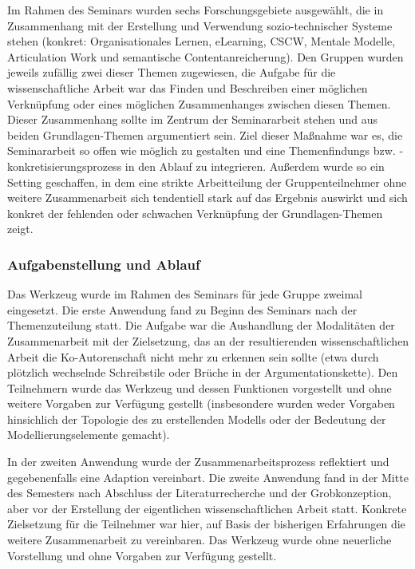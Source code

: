 Im Rahmen des Seminars wurden sechs Forschungsgebiete ausgewählt, die in Zusammenhang mit der Erstellung und Verwendung sozio-technischer Systeme stehen (konkret: Organisationales Lernen, eLearning, \gls{CSCW}, Mentale Modelle, Articulation Work und semantische Contentanreicherung). Den Gruppen wurden jeweils zufällig zwei dieser Themen zugewiesen, die Aufgabe für die wissenschaftliche Arbeit war das Finden und Beschreiben einer möglichen Verknüpfung oder eines möglichen Zusammenhanges zwischen diesen Themen. Dieser Zusammenhang sollte im Zentrum der Seminararbeit stehen und aus beiden Grundlagen-Themen argumentiert sein. Ziel dieser Maßnahme war es, die Seminararbeit so offen wie möglich zu gestalten und eine Themenfindungs bzw. -konkretisierungsprozess in den Ablauf zu integrieren. Außerdem wurde so ein Setting geschaffen, in dem eine strikte Arbeitteilung der Gruppenteilnehmer ohne weitere Zusammenarbeit sich tendentiell stark auf das Ergebnis auswirkt und sich konkret  der fehlenden oder schwachen Verknüpfung der Grundlagen-Themen zeigt.


\subsubsection{Aufgabenstellung und Ablauf} %
\label{ssub:2_aufgabenstellung}

Das Werkzeug wurde im Rahmen des Seminars für jede Gruppe zweimal eingesetzt. Die erste Anwendung fand zu Beginn des Seminars nach der Themenzuteilung statt. Die Aufgabe war die Aushandlung der Modalitäten der Zusammenarbeit mit der Zielsetzung, das an der resultierenden wissenschaftlichen Arbeit die Ko-Autorenschaft nicht mehr zu erkennen sein sollte (etwa durch plötzlich wechselnde Schreibstile oder Brüche in der Argumentationskette). Den Teilnehmern wurde das Werkzeug und dessen Funktionen vorgestellt und ohne weitere Vorgaben zur Verfügung gestellt (insbesondere wurden weder Vorgaben hinsichlich der Topologie des zu erstellenden Modells oder der Bedeutung der Modellierungselemente gemacht).

In der zweiten Anwendung wurde der Zusammenarbeitsprozess reflektiert und gegebenenfalls eine Adaption vereinbart. Die zweite Anwendung fand in der Mitte des Semesters nach Abschluss der Literaturrecherche und der Grobkonzeption, aber vor der Erstellung der eigentlichen wissenschaftlichen Arbeit statt. Konkrete Zielsetzung für die Teilnehmer war hier, auf Basis der bisherigen Erfahrungen die weitere Zusammenarbeit zu vereinbaren. Das Werkzeug wurde ohne neuerliche Vorstellung und ohne Vorgaben zur Verfügung gestellt.

